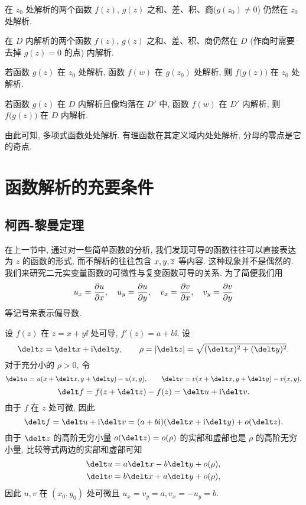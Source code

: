 \begin{theorem}
  \begin{enuma}
    \item 在 $z_0$ 处解析的两个函数 $f(z)$, $g(z)$ 之和、差、积、商($g(z_0)\neq 0$) 仍然在 $z_0$ 处解析.
    \item 在 $D$ 内解析的两个函数 $f(z)$, $g(z)$ 之和、差、积、商仍然在 $D$ (作商时需要去掉 $g(z)=0$ 的点) 内解析.
    \item 若函数 $g(z)$ 在 $z_0$ 处解析, 函数 $f(w)$ 在 $g(z_0)$ 处解析, 则 $f\bigl(g(z)\bigr)$ 在 $z_0$ 处解析.\footnotemark
    \item 若函数 $g(z)$ 在 $D$ 内解析且像均落在 $D'$ 中, 函数 $f(w)$ 在 $D'$ 内解析, 则 $f\bigl(g(z)\bigr)$ 在 $D$ 内解析.
  \end{enuma}
\end{theorem}

由此可知, 多项式函数处处解析. 有理函数在其定义域内处处解析, 分母的零点是它的奇点.



\section{函数解析的充要条件}

\subsection{柯西-黎曼定理}

在上一节中, 通过对一些简单函数的分析, 我们发现可导的函数往往可以直接表达为 $z$ 的函数的形式, 而不解析的往往包含 $x,y,\overline z$ 等内容.
这种现象并不是偶然的.
我们来研究二元实变量函数的可微性与复变函数可导的关系.
为了简便我们用
\[
  u_x=\pdv ux,\quad
  u_y=\pdv uy,\quad
  v_x=\pdv vx,\quad
  v_y=\pdv vy
\]
等记号来表示偏导数.

设 $f(z)$ 在 $z=x+y\ii$ 处可导, $f'(z)=a+b\ii$.
设
\[
  \delt z=\delt x+\ii\delt y,\qquad
  \rho=\abs{\delt z}=\sqrt{(\delt x)^2+(\delt y)^2}.
\]
对于充分小的 $\rho>0$, 令
\[
  \delt u=u(x+\delt x,y+\delt y)-u(x,y),\qquad
  \delt v=v(x+\delt x,y+\delt y)-v(x,y),
\]
\[
   \delt f
  =f(z+\delt z)-f(z)
  =\delt u+\ii\delt v.
\]
由于 $f$ 在 $z$ 处可微, 因此
\[
   \delt f
  =\delt u+\ii\delt v
  =(a+b\ii)(\delt x+\ii\delt y)+o(\delt z).
\]
由于 $\delt z$ 的高阶无穷小量 $o(\delt z)=o(\rho)$ 的实部和虚部也是 $\rho$ 的高阶无穷小量, 比较等式两边的实部和虚部可知
\begin{align*}
  \delt u&=a\delt x-b\delt y+o(\rho),\\
  \delt v&=b\delt x+a\delt y+o(\rho),
\end{align*}
因此 $u,v$ 在 $(x_0,y_0)$ 处可微且 $u_x=v_y=a,v_x=-u_y=b$.

